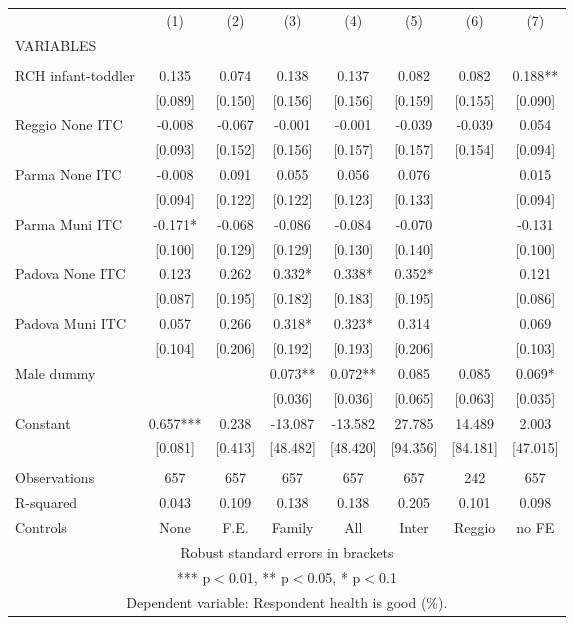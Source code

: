 \begin{tabular}{lccccccc} \hline
 & (1) & (2) & (3) & (4) & (5) & (6) & (7) \\
VARIABLES &  &  &  &  &  &  &  \\ \hline
 &  &  &  &  &  &  &  \\
RCH infant-toddler & 0.135 & 0.074 & 0.138 & 0.137 & 0.082 & 0.082 & 0.188** \\
 & [0.089] & [0.150] & [0.156] & [0.156] & [0.159] & [0.155] & [0.090] \\
Reggio None ITC & -0.008 & -0.067 & -0.001 & -0.001 & -0.039 & -0.039 & 0.054 \\
 & [0.093] & [0.152] & [0.156] & [0.157] & [0.157] & [0.154] & [0.094] \\
Parma None ITC & -0.008 & 0.091 & 0.055 & 0.056 & 0.076 &  & 0.015 \\
 & [0.094] & [0.122] & [0.122] & [0.123] & [0.133] &  & [0.094] \\
Parma Muni ITC & -0.171* & -0.068 & -0.086 & -0.084 & -0.070 &  & -0.131 \\
 & [0.100] & [0.129] & [0.129] & [0.130] & [0.140] &  & [0.100] \\
Padova None ITC & 0.123 & 0.262 & 0.332* & 0.338* & 0.352* &  & 0.121 \\
 & [0.087] & [0.195] & [0.182] & [0.183] & [0.195] &  & [0.086] \\
Padova Muni ITC & 0.057 & 0.266 & 0.318* & 0.323* & 0.314 &  & 0.069 \\
 & [0.104] & [0.206] & [0.192] & [0.193] & [0.206] &  & [0.103] \\
Male dummy &  &  & 0.073** & 0.072** & 0.085 & 0.085 & 0.069* \\
 &  &  & [0.036] & [0.036] & [0.065] & [0.063] & [0.035] \\
Constant & 0.657*** & 0.238 & -13.087 & -13.582 & 27.785 & 14.489 & 2.003 \\
 & [0.081] & [0.413] & [48.482] & [48.420] & [94.356] & [84.181] & [47.015] \\
 &  &  &  &  &  &  &  \\
Observations & 657 & 657 & 657 & 657 & 657 & 242 & 657 \\
R-squared & 0.043 & 0.109 & 0.138 & 0.138 & 0.205 & 0.101 & 0.098 \\
 Controls & None & F.E. & Family & All & Inter & Reggio & no FE \\ \hline
\multicolumn{8}{c}{ Robust standard errors in brackets} \\
\multicolumn{8}{c}{ *** p$<$0.01, ** p$<$0.05, * p$<$0.1} \\
\multicolumn{8}{c}{ Dependent variable: Respondent health is good (\%).} \\
\end{tabular}

